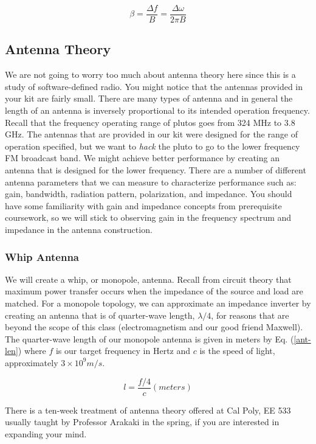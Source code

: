 \begin{equation} \label{FM mod}
    \beta = \frac{\Delta f}{B} = \frac{\Delta \omega}{2\pi B}
\end{equation}

\subsection{Antenna Theory}
We are not going to worry too much about antenna theory here since this is a study of software-defined radio. You might notice that the antennas provided in your kit are fairly small. There are many types of antenna and in general the length of an antenna is inversely proportional to its intended operation frequency. Recall that the frequency operating range of plutos goes from 324 MHz to 3.8 GHz. The antennas that are provided in our kit were designed for the range of operation specified, but we want to \textit{hack} the pluto to go to the lower frequency FM broadcast band. We might achieve better performance by creating an antenna that is designed for the lower frequency. There are a number of different antenna parameters that we can measure to characterize  performance such as: gain, bandwidth, radiation pattern, polarization, and impedance. You should have some familiarity with gain  and impedance concepts from prerequisite coursework, so we will stick to observing gain in the frequency spectrum and impedance in the antenna construction. 

\subsubsection{Whip Antenna}
We will create a whip, or monopole, antenna. Recall from circuit theory that maximum power transfer occurs when the impedance of the source and load are matched. For a monopole topology, we can approximate an impedance inverter by creating an antenna that is of quarter-wave length, $\lambda/4$, for reasons that are beyond the scope of this class (electromagnetism and our good friend Maxwell). The quarter-wave length of our monopole antenna is given in meters by Eq. (\ref{ant-len}) where $f$ is our target frequency in Hertz and $c$ is the speed of light, approximately $3\times10^{9} m/s$.

\begin{equation} \label{ant-len}
    l = \frac{f/4}{c} (meters)
\end{equation}

There is a ten-week treatment of antenna theory offered at Cal Poly, EE 533 usually taught by Professor Arakaki in the spring, if you are interested in expanding your mind.
